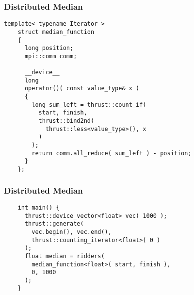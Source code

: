 \begin{frame}[fragile]
  \frametitle{Distributed Median}
  \begin{example}
    \begin{lstlisting}[basicstyle=\tiny\ttfamily]
    template< typename Iterator >
    struct median_function
    {
      long position;
      mpi::comm comm;

      __device__
      long
      operator()( const value_type& x )
      {
        long sum_left = thrust::count_if(
          start, finish,
          thrust::bind2nd(
            thrust::less<value_type>(), x
          )
        );
        return comm.all_reduce( sum_left ) - position;
      }
    };
    \end{lstlisting}
  \end{example}
\end{frame}

\begin{frame}[fragile]
  \frametitle{Distributed Median}
  \begin{example}
    \begin{lstlisting}
    int main() {
      thrust::device_vector<float> vec( 1000 );
      thrust::generate(
        vec.begin(), vec.end(),
        thrust::counting_iterator<float>( 0 )
      );
      float median = ridders(
        median_function<float>( start, finish ),
        0, 1000
      );
    }
    \end{lstlisting}
  \end{example}
\end{frame}
